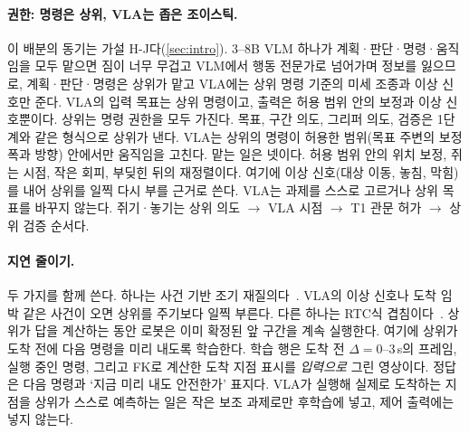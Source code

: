 \paragraph{권한: 명령은 상위, VLA는 좁은 조이스틱.} 이 배분의 동기는 가설 H-J다(\cref{sec:intro}). 3--8B VLM 하나가 계획·판단·명령·움직임을 모두 맡으면 짐이 너무 무겁고 VLM에서 행동 전문가로 넘어가며 정보를 잃으므로, 계획·판단·명령은 상위가 맡고 VLA에는 상위 명령 기준의 미세 조종과 이상 신호만 준다. VLA의 입력 목표는 상위 명령이고, 출력은 허용 범위 안의 보정과 이상 신호뿐이다. 상위는 명령 권한을 모두 가진다. 목표, 구간 의도, 그리퍼 의도, 검증은 1단계와 같은 형식으로 상위가 낸다. VLA는 상위의 명령이 허용한 범위(목표 주변의 보정 폭과 방향) 안에서만 움직임을 고친다. 맡는 일은 넷이다. 허용 범위 안의 위치 보정, 쥐는 시점, 작은 회피, 부딪힌 뒤의 재정렬이다. 여기에 이상 신호(대상 이동, 놓침, 막힘)를 내어 상위를 일찍 다시 부를 근거로 쓴다. VLA는 과제를 스스로 고르거나 상위 목표를 바꾸지 않는다. 쥐기·놓기는 상위 의도 $\rightarrow$ VLA 시점 $\rightarrow$ T1 관문 허가 $\rightarrow$ 상위 검증 순서다.

\paragraph{지연 줄이기.} 두 가지를 함께 쓴다. 하나는 사건 기반 조기 재질의다~\cite{eventtrig2026}. VLA의 이상 신호나 도착 임박 같은 사건이 오면 상위를 주기보다 일찍 부른다. 다른 하나는 RTC식 겹침이다~\cite{black2025rtc}. 상위가 답을 계산하는 동안 로봇은 이미 확정된 앞 구간을 계속 실행한다. 여기에 상위가 도착 전에 다음 명령을 미리 내도록 학습한다. 학습 행은 도착 전 $\Delta=0$--3\,s의 프레임, 실행 중인 명령, 그리고 FK로 계산한 도착 지점 표시를 \emph{입력으로} 그린 영상이다. 정답은 다음 명령과 `지금 미리 내도 안전한가' 표지다. VLA가 실행해 실제로 도착하는 지점을 상위가 스스로 예측하는 일은 작은 보조 과제로만 후학습에 넣고, 제어 출력에는 넣지 않는다.

\label{sec:vla}

